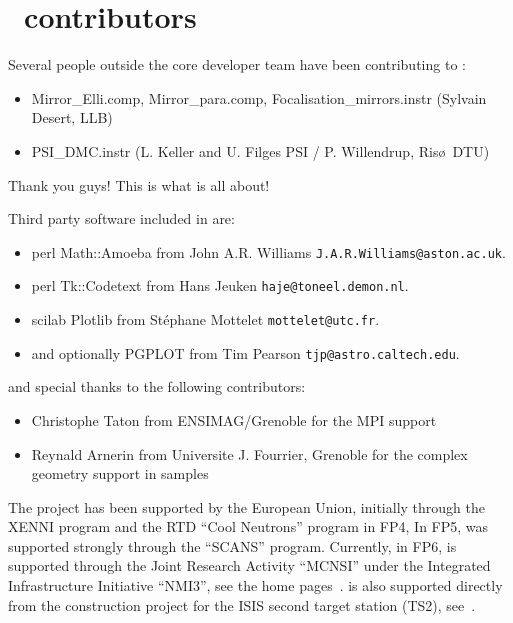\section*{\MCS \version\ contributors}
Several people outside the core developer team have been contributing
to \MCS \version:
\begin{itemize}
\item Mirror\_Elli.comp, Mirror\_para.comp,
  Focalisation\_mirrors.instr (Sylvain Desert, LLB)
\item PSI\_DMC.instr (L. Keller and U. Filges PSI / P. Willendrup, Ris\o\ DTU)
\end{itemize}
Thank you guys! This is what \MCS is all about!

Third party software included in \MCS are:
\begin{itemize}
\item perl Math::Amoeba from John A.R. Williams \verb+J.A.R.Williams@aston.ac.uk+.
\item perl Tk::Codetext from Hans Jeuken \verb+haje@toneel.demon.nl+.
\item scilab Plotlib from St\'ephane Mottelet \verb+mottelet@utc.fr+.
\item and optionally PGPLOT from Tim Pearson \verb+tjp@astro.caltech.edu+.
\end{itemize}
and special thanks to the following \MCS contributors:
\begin{itemize}
\item Christophe Taton from ENSIMAG/Grenoble for the MPI support
\item Reynald Arnerin from Universite J. Fourrier, Grenoble for the complex geometry support in samples
\end{itemize} 

The \MCS project has been supported by the European Union, initially
through the XENNI program and the RTD ``Cool Neutrons'' program in FP4,
In FP5, \MCS was supported strongly through the
``SCANS'' program.
Currently, in FP6, \MCS is supported through the Joint Research Activity
``MCNSI'' under the Integrated Infrastructure Initiative ``NMI3'', see
the home pages~\cite{mcnsi_webpage,nmi3_webpage}. \MCS is also
supported directly from the construction project for the ISIS second
target station (TS2), see~\cite{ts2_webpage}.
